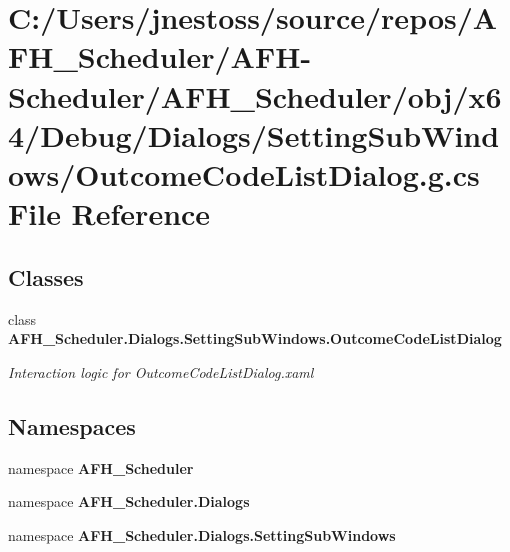 \section{C\+:/\+Users/jnestoss/source/repos/\+A\+F\+H\+\_\+\+Scheduler/\+A\+F\+H-\/\+Scheduler/\+A\+F\+H\+\_\+\+Scheduler/obj/x64/\+Debug/\+Dialogs/\+Setting\+Sub\+Windows/\+Outcome\+Code\+List\+Dialog.g.\+cs File Reference}
\label{x64_2_debug_2_dialogs_2_setting_sub_windows_2_outcome_code_list_dialog_8g_8cs}
\subsection*{Classes}
\begin{DoxyCompactItemize}
\item 
class \textbf{ A\+F\+H\+\_\+\+Scheduler.\+Dialogs.\+Setting\+Sub\+Windows.\+Outcome\+Code\+List\+Dialog}
\begin{DoxyCompactList}\small\item\em Interaction logic for Outcome\+Code\+List\+Dialog.\+xaml \end{DoxyCompactList}\end{DoxyCompactItemize}
\subsection*{Namespaces}
\begin{DoxyCompactItemize}
\item 
namespace \textbf{ A\+F\+H\+\_\+\+Scheduler}
\item 
namespace \textbf{ A\+F\+H\+\_\+\+Scheduler.\+Dialogs}
\item 
namespace \textbf{ A\+F\+H\+\_\+\+Scheduler.\+Dialogs.\+Setting\+Sub\+Windows}
\end{DoxyCompactItemize}
